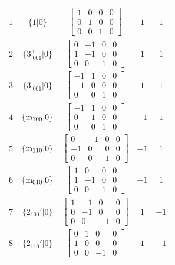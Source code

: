 \documentclass[fleqn,8pt]{jsarticle}
\begin{document}
\begin{longtable}{ccccc}
$ 1 $ & $ \{1|0\} $ & $ \begin{bmatrix} 1 & 0 & 0 & 0 \\ 0 & 1 & 0 & 0 \\ 0 & 0 & 1 & 0 \end{bmatrix} $ & $ 1 $ & $ 1 $ \\ \hline
$ 2 $ & $ \{3^{+}_{\,\,001}|0\} $ & $ \begin{bmatrix} 0 & -1 & 0 & 0 \\ 1 & -1 & 0 & 0 \\ 0 & 0 & 1 & 0 \end{bmatrix} $ & $ 1 $ & $ 1 $ \\ \hline
$ 3 $ & $ \{3^{-}_{\,\,001}|0\} $ & $ \begin{bmatrix} -1 & 1 & 0 & 0 \\ -1 & 0 & 0 & 0 \\ 0 & 0 & 1 & 0 \end{bmatrix} $ & $ 1 $ & $ 1 $ \\ \hline
$ 4 $ & $ \{{\rm m}_{100}|0\} $ & $ \begin{bmatrix} -1 & 1 & 0 & 0 \\ 0 & 1 & 0 & 0 \\ 0 & 0 & 1 & 0 \end{bmatrix} $ & $ -1 $ & $ 1 $ \\ \hline
$ 5 $ & $ \{{\rm m}_{110}|0\} $ & $ \begin{bmatrix} 0 & -1 & 0 & 0 \\ -1 & 0 & 0 & 0 \\ 0 & 0 & 1 & 0 \end{bmatrix} $ & $ -1 $ & $ 1 $ \\ \hline
$ 6 $ & $ \{{\rm m}_{010}|0\} $ & $ \begin{bmatrix} 1 & 0 & 0 & 0 \\ 1 & -1 & 0 & 0 \\ 0 & 0 & 1 & 0 \end{bmatrix} $ & $ -1 $ & $ 1 $ \\ \hline
$ 7 $ & $ \{2{}_{100}{}'|0\} $ & $ \begin{bmatrix} 1 & -1 & 0 & 0 \\ 0 & -1 & 0 & 0 \\ 0 & 0 & -1 & 0 \end{bmatrix} $ & $ 1 $ & $ -1 $ \\ \hline
$ 8 $ & $ \{2{}_{110}{}'|0\} $ & $ \begin{bmatrix} 0 & 1 & 0 & 0 \\ 1 & 0 & 0 & 0 \\ 0 & 0 & -1 & 0 \end{bmatrix} $ & $ 1 $ & $ -1 $ \\ \hline

\end{longtable}
\end{document}
